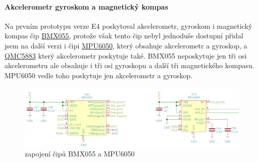 \paragraph*{Akcelerometr gyroskom a magnetický kompas}
Na prvním prototypu verze E4 poskytoval akcelerometr, gyroskom i magnetický kompas čip \href{https://datasheet.lcsc.com/szlcsc/Bosch-Sensortec-BMX055_C94022.pdf}{BMX055}, protože však 
tento čip nebyl jednoduše dostupní přidal jsem na další verzi i čipi \href{https://datasheet.lcsc.com/szlcsc/TDK-InvenSense-MPU-6050_C24112.pdf}{MPU6050},
který obsahuje akcelerometr a gyroskop,
a \href{https://datasheet.lcsc.com/szlcsc/QST-QMC5883L-TR_C192585.pdf}{QMC5883} který akcelerometr poskytuje také. BMX055 neposkytuje jen tři osi 
akcelerometru ale obsahuje i tři osi gyroskopu a další tři magnetického kompasu. MPU6050 vedle toho poskytuje jen akcelerometr a gyroskop. 


\begin{figure}[htbp]
    \centering
    \includegraphics[width=\textwidth]{kapitoly/obrazky/E4/vnimani/BMX-MPU.png}
    \caption{zapojení čipů BMX055 a MPU6050}
    \label{fig:E4-step-up}
\end{figure}